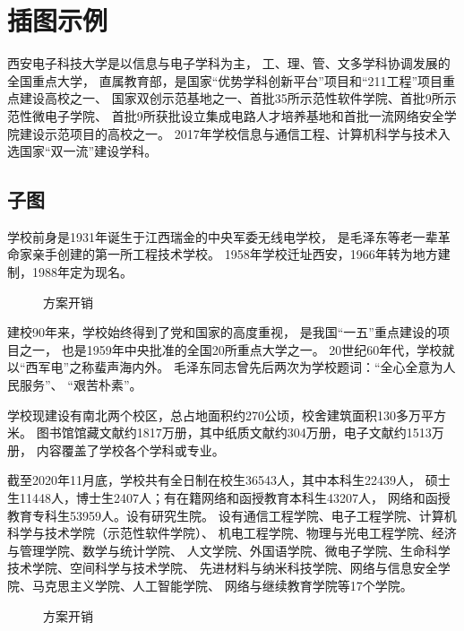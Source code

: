 \chapter{插图示例}
西安电子科技大学是以信息与电子学科为主，
工、理、管、文多学科协调发展的全国重点大学，
直属教育部，是国家“优势学科创新平台”项目和“211工程”项目重点建设高校之一、
国家双创示范基地之一、首批35所示范性软件学院、首批9所示范性微电子学院、
首批9所获批设立集成电路人才培养基地和首批一流网络安全学院建设示范项目的高校之一。
2017年学校信息与通信工程、计算机科学与技术入选国家“双一流”建设学科。
\section{子图}
学校前身是1931年诞生于江西瑞金的中央军委无线电学校，
是毛泽东等老一辈革命家亲手创建的第一所工程技术学校。
1958年学校迁址西安，1966年转为地方建制，1988年定为现名。
\begin{figure}
\centering
{}
\hfil
{}\caption{方案开销}
\label{fig3}
\end{figure}
\par
建校90年来，学校始终得到了党和国家的高度重视，
是我国“一五”重点建设的项目之一，
也是1959年中央批准的全国20所重点大学之一。
20世纪60年代，学校就以“西军电”之称蜚声海内外。
毛泽东同志曾先后两次为学校题词：“全心全意为人民服务”、
“艰苦朴素”。
\par
学校现建设有南北两个校区，总占地面积约270公顷，校舍建筑面积130多万平方米。
图书馆馆藏文献约1817万册，其中纸质文献约304万册，电子文献约1513万册，
内容覆盖了学校各个学科或专业。
\par
截至2020年11月底，学校共有全日制在校生36543人，其中本科生22439人，
硕士生11448人，博士生2407人；有在籍网络和函授教育本科生43207人，
网络和函授教育专科生53959人。设有研究生院。
设有通信工程学院、电子工程学院、计算机科学与技术学院（示范性软件学院）、
机电工程学院、物理与光电工程学院、经济与管理学院、数学与统计学院、
人文学院、外国语学院、微电子学院、生命科学技术学院、空间科学与技术学院、
先进材料与纳米科技学院、网络与信息安全学院、马克思主义学院、人工智能学院、
网络与继续教育学院等17个学院。
\begin{figure}
\centering
{}
\hfil
{}
\hfil
{}
\hfil
{}
\hfil
{}
\caption{方案开销}
\label{fig9}
\end{figure}
